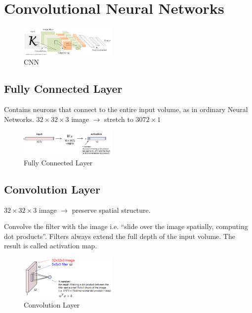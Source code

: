 \newpage
\section{Convolutional Neural Networks}
\begin{figure}[!htb]
    \centering
    \includegraphics[width=0.42\textwidth]{pic/Lec5/CNN.png}
    \caption{CNN}
\end{figure}

\subsection{Fully Connected Layer}
Contains neurons that connect to the entire input volume, as in ordinary Neural Networks. $32\times 32\times 3$ image $\rightarrow$ stretch to $3072\times 1$

\begin{figure}[!htb]
    \centering
    \includegraphics[width=0.42\textwidth]{pic/Lec5/FC.png}
    \caption{Fully Connected Layer}
\end{figure}

\subsection{Convolution Layer}
$32\times 32\times 3$ image $\rightarrow$ preserve spatial structure. 

Convolve the filter with the image i.e. ``slide over the image spatially, computing dot products''. Filters always extend the full depth of the input volume. The result is called activation map.

\begin{figure}[!htb]
    \centering
    \includegraphics[width=0.42\textwidth]{pic/Lec5/C.png}
    \caption{Convolution Layer}
\end{figure}

